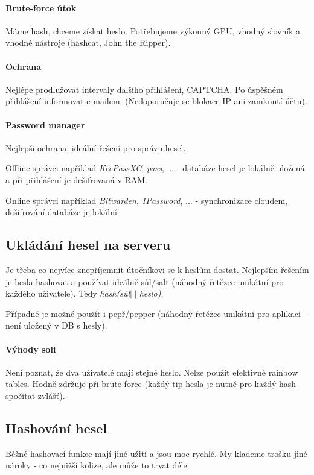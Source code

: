 \documentclass[10pt,a4paper]{article}
\begin{document}
\paragraph{Brute-force útok} Máme hash, chceme získat heslo. Potřebujeme výkonný GPU, vhodný slovník a vhodné nástroje (hashcat, John the Ripper).

\paragraph{Ochrana}
Nejlépe prodlužovat intervaly dalšího přihlášení, CAPTCHA.
Po úspěšném přihlášení informovat e-mailem. (Nedoporučuje se blokace IP ani zamknutí účtu).

\paragraph{Password manager}
Nejlepší ochrana, ideální řešení pro správu hesel. 

Offline správci například \textit{KeePassXC}, \textit{pass}, ... - databáze hesel je lokálně uložená a při přihlášení je dešifrovaná v RAM.

Online správci například \textit{Bitwarden}, \textit{1Password}, ... - synchronizace cloudem, dešifrování databáze je lokální.


\subsection{Ukládání hesel na serveru}

Je třeba co nejvíce znepříjemnit útočníkovi se k heslům dostat. Nejlepším řešením je hesla hashovat a používat ideálně sůl/salt (náhodný řetězec unikátní pro každého uživatele).
Tedy \textit{hash(sůl$ \mid\mid $heslo)}.

Případně je možné použít i pepř/pepper (náhodný řetězec unikátní pro aplikaci - není uložený v DB s hesly).

\paragraph{Výhody soli} Není poznat, že dva uživatelé mají stejné heslo. Nelze použít efektivně rainbow tables. Hodně zdržuje při brute-force (každý tip hesla je nutné pro každý hash spočítat zvlášť).

\subsection{Hashování hesel}
Běžné hashovací funkce mají jiné užití a jsou moc rychlé. My klademe trošku jiné nároky - co nejnižší kolize, ale může to trvat déle.
\end{document}
